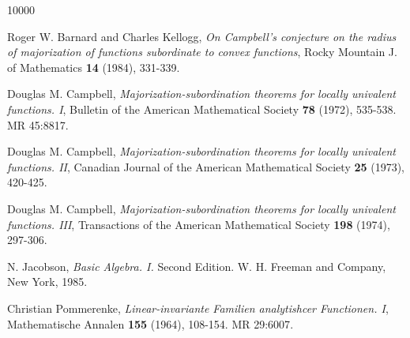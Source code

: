 \documentclass[12pt]{article}
\begin{document}
\vspace{0.1in}

% 

\def\cprime{$'$}
\providecommand{\bysame}{\leavevmode\hbox to3em{\hrulefill}\thinspace}
\providecommand{\MR}{\relax\ifhmode\unskip\space\fi MR }
\providecommand{\MRhref}[2]{%
  \href{http://www.ams.org/mathscinet-getitem?mr=#1}{#2}
}
\providecommand{\href}[2]{#2}


\begin{thebibliography}{10000}

Roger W. Barnard and Charles Kellogg, \emph{On Campbell's conjecture on the radius of majorization of functions subordinate to convex functions}, Rocky Mountain J. of Mathematics \textbf{14} (1984), 331-339. 

Douglas M. Campbell, \emph{Majorization-subordination theorems for locally univalent functions. I}, Bulletin
  of the American Mathematical Society \textbf{78} (1972), 535-538. \MR{45:8817}.
  
Douglas M. Campbell, \emph{Majorization-subordination theorems for locally univalent functions. II}, Canadian 
  Journal of the American Mathematical Society \textbf{25} (1973), 420-425. 
  
Douglas M. Campbell, \emph{Majorization-subordination theorems for locally univalent functions. III}, Transactions
  of the American Mathematical Society \textbf{198} (1974), 297-306. 
  
 N. Jacobson, 
\textit{Basic Algebra. I.} Second Edition.  W. H. Freeman and Company, New York, 1985. %

Christian Pommerenke, \emph{Linear-invariante Familien analytishcer Functionen. I}, Mathematische Annalen \textbf{155} 
  (1964), 108-154. \MR{29:6007}.
  
\end{thebibliography}
\end{document}
